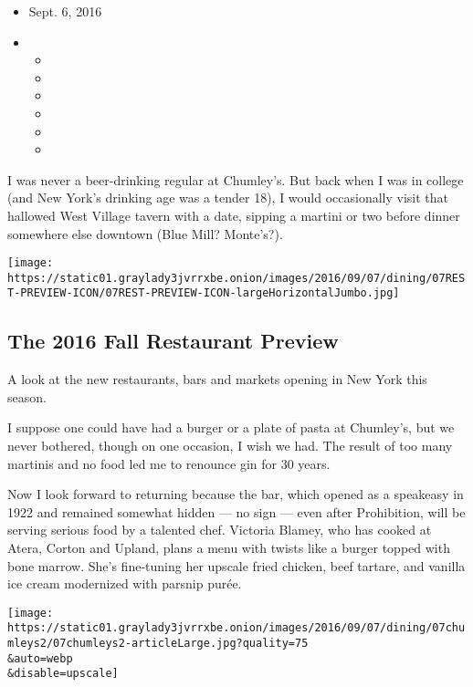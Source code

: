 \begin{itemize}
\item
  Sept. 6, 2016
\item
  \begin{itemize}
  \item
  \item
  \item
  \item
  \item
  \item
  \end{itemize}
\end{itemize}

I was never a beer-drinking regular at Chumley's. But back when I was in
college (and New York's drinking age was a tender 18), I would
occasionally visit that hallowed West Village tavern with a date,
sipping a martini or two before dinner somewhere else downtown (Blue
Mill? Monte's?).

\href{https://www.nytimes3xbfgragh.onion/interactive/2016/09/07/dining/new-york-restaurants-fall-openings.html}{}

\texttt{[image: https://static01.graylady3jvrrxbe.onion/images/2016/09/07/dining/07REST-PREVIEW-ICON/07REST-PREVIEW-ICON-largeHorizontalJumbo.jpg]}

\hypertarget{the-2016-fall-restaurant-preview}{%
\subsection{The 2016 Fall Restaurant
Preview}\label{the-2016-fall-restaurant-preview}}

A look at the new restaurants, bars and markets opening in New York this
season.

I suppose one could have had a burger or a plate of pasta at Chumley's,
but we never bothered, though on one occasion, I wish we had. The result
of too many martinis and no food led me to renounce gin for 30 years.

Now I look forward to returning because the bar, which opened as a
speakeasy in 1922 and remained somewhat hidden --- no sign --- even
after Prohibition, will be serving serious food by a talented chef.
Victoria Blamey, who has cooked at Atera, Corton and Upland, plans a
menu with twists like a burger topped with bone marrow. She's
fine-tuning her upscale fried chicken, beef tartare, and vanilla ice
cream modernized with parsnip purée.

\texttt{[image: https://static01.graylady3jvrrxbe.onion/images/2016/09/07/dining/07chumleys2/07chumleys2-articleLarge.jpg?quality=75\\\&auto=webp\\\&disable=upscale]}

